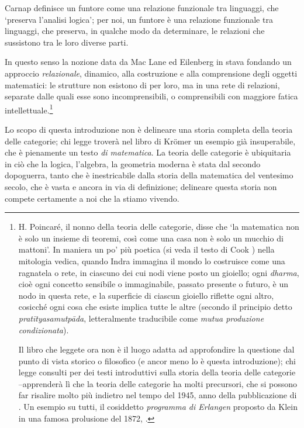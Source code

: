 Carnap definisce un funtore come una relazione funzionale tra linguaggi, che `preserva l'analisi logica'; per noi, un funtore è una relazione funzionale tra linguaggi, che preserva, in qualche modo da determinare, le relazioni che sussistono tra le loro diverse parti.

In questo senso la nozione data da Mac Lane ed Eilenberg in \cite{gtone} stava fondando un approccio \emph{relazionale}, dinamico, alla costruzione e alla comprensione degli oggetti matematici: le strutture non esistono di per loro, ma in una rete di relazioni, separate dalle quali esse sono incomprensibili, o comprensibili con maggiore fatica intellettuale.\footnote{H. Poincaré, il nonno della teoria delle categorie, disse che `la matematica non è solo un insieme di teoremi, così come una casa non è solo un mucchio di mattoni'. In maniera un po' più poetica (si veda il testo di Cook \cite{Cook1977-ry}) nella mitologia vedica, quando Indra immagina il mondo lo costruisce come una ragnatela o rete, in ciascuno dei cui nodi viene posto un gioiello; ogni \emph{dharma}, cioè ogni concetto sensibile o immaginabile, passato presente o futuro, è un nodo in questa rete, e la superficie di ciascun gioiello riflette ogni altro, cosicché ogni cosa che esiste implica tutte le altre (secondo il principio detto \emph{pratītyasamutpāda}, letteralmente traducibile come \emph{mutua produzione condizionata}).

	Il libro che leggete ora non è il luogo adatta ad approfondire la questione dal punto di vista storico o filosofico (e ancor meno lo è questa introduzione); chi legge consulti \cite{marquis, kromer} per dei testi introduttivi sulla storia della teoria delle categorie --apprenderà lì che la teoria delle categorie ha molti precursori, che si possono far risalire molto più indietro nel tempo del 1945, anno della pubblicazione di \cite{gtone}. Un esempio su tutti, il cosiddetto \emph{programma di Erlangen} proposto da Klein in una famosa prolusione del 1872, \cite{Klein1893}.}

\medskip
Lo scopo di questa introduzione non è delineare una storia completa della teoria delle categorie; chi legge troverà nel libro di Kr\"omer \cite{kromer} un esempio già insuperabile, che è pienamente un testo \emph{di matematica}. La teoria delle categorie è ubiquitaria in ciò che la logica, l'algebra, la geometria moderna è stata dal secondo dopoguerra, tanto che è inestricabile dalla storia della matematica del ventesimo secolo, che è vasta e ancora in via di definizione; delineare questa storia non compete certamente a noi che la stiamo vivendo.

